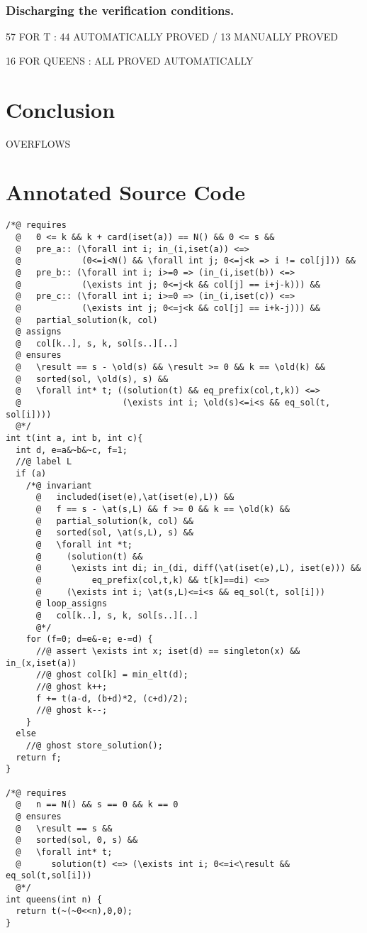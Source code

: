 \documentclass[a4paper]{llncs}
\begin{document}
\subsubsection{Discharging the verification conditions.}


57 FOR T : 44 AUTOMATICALLY PROVED / 13 MANUALLY PROVED

16 FOR QUEENS : ALL PROVED AUTOMATICALLY

\section{Conclusion}

OVERFLOWS

\nocite{*}



\appendix
\section{Annotated Source Code}\label{app:code}
{\footnotesize
\begin{verbatim}
/*@ requires
  @   0 <= k && k + card(iset(a)) == N() && 0 <= s &&
  @   pre_a:: (\forall int i; in_(i,iset(a)) <=> 
  @            (0<=i<N() && \forall int j; 0<=j<k => i != col[j])) &&
  @   pre_b:: (\forall int i; i>=0 => (in_(i,iset(b)) <=> 
  @            (\exists int j; 0<=j<k && col[j] == i+j-k))) &&
  @   pre_c:: (\forall int i; i>=0 => (in_(i,iset(c)) <=> 
  @            (\exists int j; 0<=j<k && col[j] == i+k-j))) &&
  @   partial_solution(k, col)
  @ assigns
  @   col[k..], s, k, sol[s..][..]
  @ ensures  
  @   \result == s - \old(s) && \result >= 0 && k == \old(k) &&
  @   sorted(sol, \old(s), s) &&
  @   \forall int* t; ((solution(t) && eq_prefix(col,t,k)) <=>
  @                    (\exists int i; \old(s)<=i<s && eq_sol(t, sol[i])))
  @*/
int t(int a, int b, int c){
  int d, e=a&~b&~c, f=1;
  //@ label L
  if (a)
    /*@ invariant 
      @   included(iset(e),\at(iset(e),L)) &&
      @   f == s - \at(s,L) && f >= 0 && k == \old(k) && 
      @   partial_solution(k, col) &&
      @   sorted(sol, \at(s,L), s) &&
      @   \forall int *t; 
      @     (solution(t) && 
      @      \exists int di; in_(di, diff(\at(iset(e),L), iset(e))) &&
      @          eq_prefix(col,t,k) && t[k]==di) <=>
      @     (\exists int i; \at(s,L)<=i<s && eq_sol(t, sol[i]))
      @ loop_assigns
      @   col[k..], s, k, sol[s..][..]
      @*/
    for (f=0; d=e&-e; e-=d) {
      //@ assert \exists int x; iset(d) == singleton(x) && in_(x,iset(a)) 
      //@ ghost col[k] = min_elt(d);
      //@ ghost k++;                
      f += t(a-d, (b+d)*2, (c+d)/2);
      //@ ghost k--;                
    }
  else 
    //@ ghost store_solution();
  return f;
}

/*@ requires 
  @   n == N() && s == 0 && k == 0
  @ ensures 
  @   \result == s &&
  @   sorted(sol, 0, s) &&
  @   \forall int* t; 
  @      solution(t) <=> (\exists int i; 0<=i<\result && eq_sol(t,sol[i]))
  @*/
int queens(int n) {
  return t(~(~0<<n),0,0);
}
\end{verbatim}
}
\end{document}
